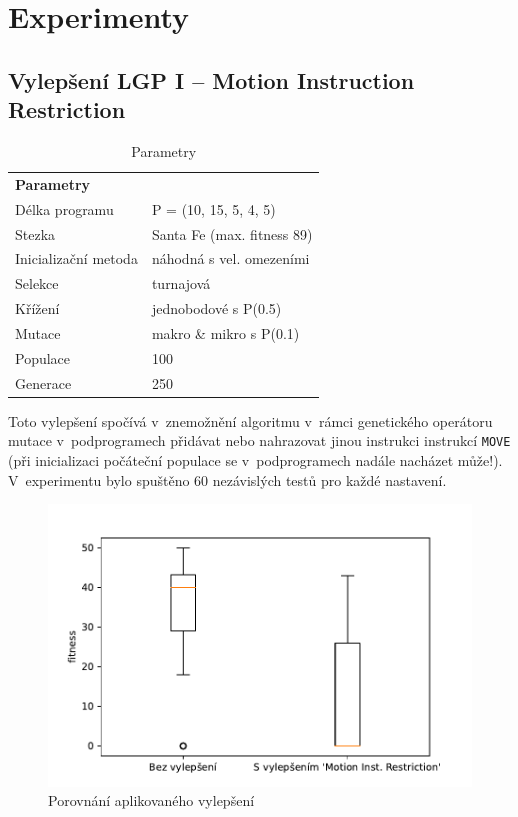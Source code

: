 \clearpage
\section{Experimenty}
\subsection{Vylepšení LGP I -- Motion Instruction Restriction}\label{subsection:2}

\begin{table}[!h]
\centering
\begin{tabular}{ll}
\hline
\textbf{Parametry}      &             \\
Délka programu       & P = (10, 15, 5, 4, 5)  \\
Stezka               & Santa Fe (max. fitness 89) \\
Inicializační metoda & náhodná s vel. omezeními  \\
Selekce              & turnajová          \\
Křížení              & jednobodové s P(0.5) \\
Mutace               & makro \& mikro s P(0.1)\\ 
Populace             & 100 \\ 
Generace             & 250 \\ \hline
\end{tabular}
\label{tab:6.3.3}
\caption{Parametry}
\end{table}

Toto vylepšení spočívá v~znemožnění algoritmu v~rámci genetického operátoru mutace v~podprogramech přidávat nebo nahrazovat jinou instrukci instrukcí \texttt{MOVE} (při inicializaci počáteční populace se v~podprogramech nadále nacházet může!). V~experimentu bylo spuštěno 60 nezávislých testů pro každé nastavení. 

\begin{figure}[!h]
    \centering
    \includegraphics[scale=0.8]{obrazky-figures/exp-lgp-santafe-improvement-mut.pdf}
    \caption{Porovnání aplikovaného vylepšení}
    \label{fig:exp-lgp-santafe-improvement-mut}
\end{figure}

